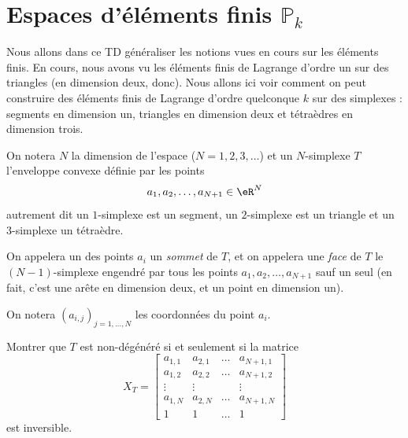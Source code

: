 
\newpage

\section{Espaces d'éléments finis $\mathbb{P}_k$}

Nous allons dans ce TD généraliser les notions vues en cours sur les éléments finis. En cours, nous avons vu les éléments finis de Lagrange d'ordre un sur des triangles (en dimension deux, donc). Nous allons ici voir comment on peut construire des éléments finis de Lagrange d'ordre quelconque $k$ sur des simplexes : segments en dimension un,  triangles en dimension deux et tétraèdres en dimension trois.

\medskip

On notera $N$ la dimension de l'espace ($N=1,2,3,\dots$) et un $N$-simplexe $T$ l'enveloppe convexe définie par les points
\[
a_1, a_2 , \ldots, a_{N+1} \in \eR^N
\]
autrement dit un $1$-simplexe est un segment, un $2$-simplexe est un triangle et un $3$-simplexe un tétraèdre.

\medskip

On appelera un des points $a_i$ un \emph{sommet} de $T$, et on appelera une \emph{face} de $T$ le $(N-1)$-simplexe engendré par tous les points $a_1, a_2 , \ldots, a_{N+1}$ sauf un seul (en fait, c'est une arête en dimension deux, et un point en dimension un).

\medskip

On notera $(a_{i,j})_{j=1,\ldots,N}$ les coordonnées du point $a_i$.

\medskip

\begin{exercice}\label{exoChPk_nondeg}

Montrer que $T$ est non-dégénéré si et seulement si la matrice
\[
X_T = \left [
\begin{array}{cccc}
a_{1,1} & a_{2,1} & \ldots & a_{N+1,1} \\
a_{1,2} & a_{2,2} & \ldots & a_{N+1,2} \\
\vdots & \vdots & & \vdots \\
a_{1,N} & a_{2,N} & \ldots & a_{N+1,N} \\
1 & 1 & \ldots & 1
\end{array}
\right ]
\]
est inversible.
\end{exercice}

\medskip

